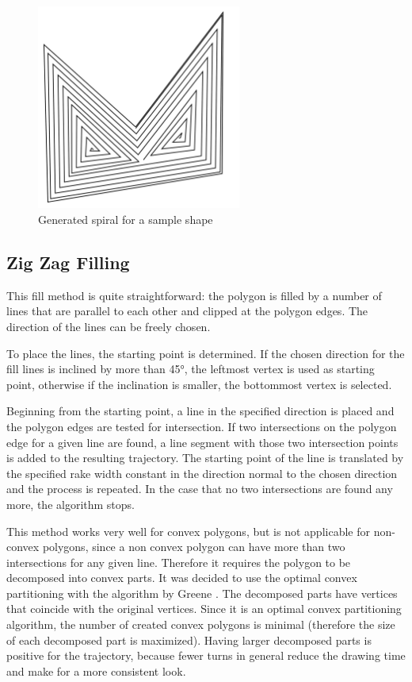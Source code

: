 \begin{figure}
\centering
\includegraphics[width=0.6\textwidth]{images/algorithms/spiral_fill/spiral_real.pdf}
\caption{Generated spiral for a sample shape} \label{fig:gen_spiral}
\end{figure}

\clearpage

\subsection{Zig Zag Filling}

This fill method is quite straightforward: the polygon is filled by a number of lines that are parallel to each other and clipped at the polygon edges. The direction of the lines can be freely chosen.

To place the lines, the starting point is determined. If the chosen direction for the fill lines is inclined by more than 45°, the leftmost vertex is used as starting point, otherwise if the inclination is smaller, the bottommost vertex is selected.

Beginning from the starting point, a line in the specified direction is placed and the polygon edges are tested for intersection. If two intersections on the polygon edge for a given line are found, a line segment with those two intersection points is added to the resulting trajectory. The starting point of the line is translated by the specified rake width constant in the direction normal to the chosen direction and the process is repeated. In the case that no two intersections are found any more, the algorithm stops.

This method works very well for convex polygons, but is not applicable for non-convex polygons, since a non convex polygon can have more than two intersections for any given line. Therefore it requires the polygon to be decomposed into convex parts. It was decided to use the optimal convex partitioning with the algorithm by Greene \cite{greene1983decomposition}. The decomposed parts have vertices that coincide with the original vertices. Since it is an optimal convex partitioning algorithm, the number of created convex polygons is minimal (therefore the size of each decomposed part is maximized). Having larger decomposed parts is positive for the trajectory, because fewer turns in general reduce the drawing time and make for a more consistent look.

